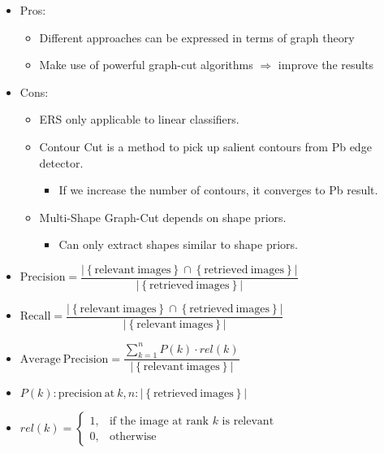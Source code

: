 \documentclass[11pt, a4paper, landscape]{article}
\begin{document}
\NewPage{}
\vfill
\begin{itemize}
	\item Pros:
	\begin{itemize}
		\item Different approaches can be expressed in terms of graph theory
		\item Make use of powerful graph-cut algorithms $\Rightarrow$ improve the results
	\end{itemize}
	\item Cons:
	\begin{itemize}
		\item ERS only applicable to linear classifiers.
		\item Contour Cut is a method to pick up salient contours from Pb edge detector.
		\begin{itemize}
			\item If we increase the number of contours, it converges to Pb result.
		\end{itemize}
		\item Multi-Shape Graph-Cut depends on shape priors.
		\begin{itemize}
			\item Can only extract shapes similar to shape priors.
		\end{itemize}
	\end{itemize}
\end{itemize}
\vfill




\FinalPage



\appendix
\NewPage{}
\vfill
\begin{itemize}
\item $\mathrm{Precision} = \dfrac{\lvert \left\lbrace \mathrm{relevant\ images} \right\rbrace \cap \left\lbrace \mathrm{retrieved\ images} \right\rbrace \rvert}{\lvert \left\lbrace \mathrm{retrieved\ images} \right\rbrace \rvert}$
\item $\mathrm{Recall} = \dfrac{\lvert \left\lbrace \mathrm{relevant\ images} \right\rbrace \cap \left\lbrace \mathrm{retrieved\ images} \right\rbrace \rvert}{\lvert \left\lbrace \mathrm{relevant\ images} \right\rbrace \rvert}$
\item $\mathrm{Average\ Precision} = \dfrac{\sum\limits_{k = 1}^{n} P(k)\cdot rel(k)}{\lvert \left\lbrace \mathrm{relevant\ images} \right\rbrace \rvert}$
\item $P(k): \mathrm{precision\ at\ } k, n: \lvert \left\lbrace \mathrm{retrieved\ images} \right\rbrace \rvert$
\item $rel(k) = \begin{cases} 1, & \mbox{if the image at rank } k\mbox{ is relevant} \\ 0, & \mbox{otherwise} \end{cases}$
\end{itemize}
\vfill
\end{document}
